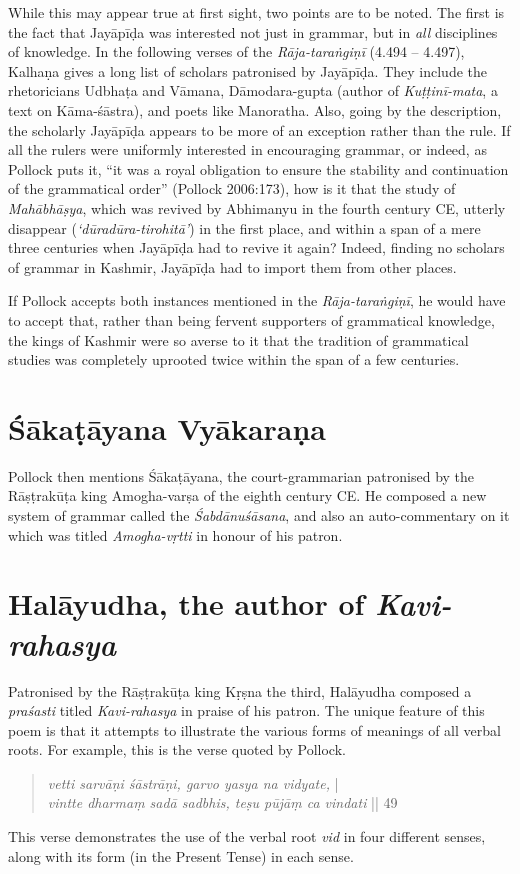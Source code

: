 While this may appear true at first sight, two points are to be noted. The first is the fact that Jayāpīḍa was interested not just in grammar, but in {\sl all} disciplines of knowledge. In the following verses of the {\sl Rāja-taraṅgiṇī} (4.494 -- 4.497), Kalhaṇa gives a long list of scholars patronised by Jayāpīḍa. They include the rhetoricians Udbhaṭa and Vāmana, Dāmodara-gupta (author of {\sl Kuṭṭinī-mata}, a text on Kāma-śāstra), and poets like Manoratha. Also, going by the description, the scholarly Jayāpīḍa appears to be more of an exception rather than the rule. If all the rulers were uniformly interested in encouraging grammar, or indeed, as Pollock puts it, ``it was a royal obligation to ensure the stability and continuation of the grammatical order'' (Pollock 2006:173), how is it that the study of {\sl Mahābhāṣya}, which was revived by Abhimanyu in the fourth century CE, utterly disappear ({\sl `dūradūra-tirohitā'}) in the first place, and within a span of a mere three centuries when Jayāpīḍa had to revive it again? Indeed, finding no scholars of grammar in Kashmir, Jayāpīḍa had to import them from other places. 

If Pollock accepts both instances mentioned in the {\sl Rāja-taraṅgiṇī}, he would have to accept that, rather than being fervent supporters of grammatical knowledge, the kings of Kashmir were so averse to it that the tradition of grammatical studies was completely uprooted twice within the span of a few centuries.

\section{Śākaṭāyana Vyākaraṇa}\label{chap3-sec13}

Pollock then mentions Śākaṭāyana,  the court-grammarian patronised by the Rāṣṭrakūṭa king Amogha-varṣa of the eighth century CE. He composed a new system of grammar called the {\sl Śabdānuśāsana}, and also an auto-commentary on it which was titled {\sl Amogha-vṛtti} in honour of his patron. 

\section{Halāyudha, the author of {\sl\bfseries Kavi-rahasya}}\label{chap3-sec14}

Patronised by the Rāṣṭrakūṭa king Kṛṣna the third, Halāyudha composed a {\sl praśasti} titled {\sl Kavi-rahasya} in praise of his patron. The unique feature of this poem is that it attempts to illustrate the various forms of meanings of all verbal roots. For example, this is the verse quoted by Pollock. 
\begin{quote}
{{\sl vetti sarvāṇi śāstrāṇi, garvo yasya na vidyate,}} |\\[2pt]
{{\sl vintte dharmaṃ sadā sadbhis, teṣu pūjāṃ ca vindati}} || 49 
\end{quote}
This verse demonstrates the use of the verbal root {\sl vid} in four different senses, along with its form (in the Present Tense) in each sense.

